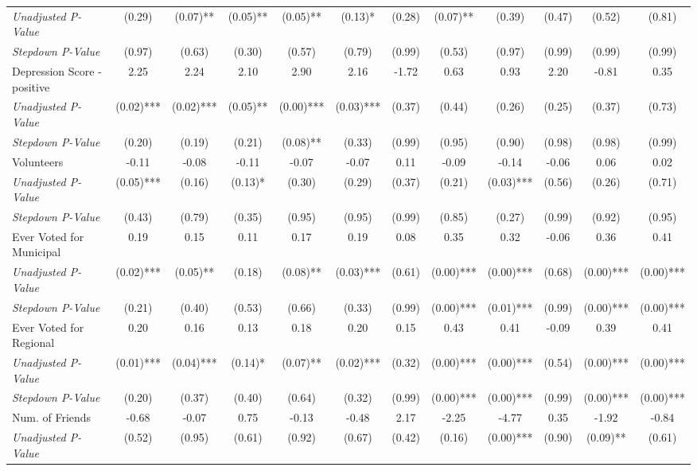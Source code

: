 \begin{tabular}{l c c c c c c c c c c c}
\quad \textit{Unadjusted P-Value} & (0.29) & (0.07)** & (0.05)** & (0.05)** & (0.13)* & (0.28) & (0.07)** & (0.39) & (0.47) & (0.52) & (0.81) \\
\quad \textit{Stepdown P-Value} & (0.97) & (0.63) & (0.30) & (0.57) & (0.79) & (0.99) & (0.53) & (0.97) & (0.99) & (0.99) & (0.99) \\
Depression Score - positive & 2.25 & 2.24 & 2.10 & 2.90 & 2.16 & -1.72 & 0.63 & 0.93 & 2.20 & -0.81 & 0.35 \\
\quad \textit{Unadjusted P-Value} & (0.02)*** & (0.02)*** & (0.05)** & (0.00)*** & (0.03)*** & (0.37) & (0.44) & (0.26) & (0.25) & (0.37) & (0.73) \\
\quad \textit{Stepdown P-Value} & (0.20) & (0.19) & (0.21) & (0.08)** & (0.33) & (0.99) & (0.95) & (0.90) & (0.98) & (0.98) & (0.99) \\
Volunteers & -0.11 & -0.08 & -0.11 & -0.07 & -0.07 & 0.11 & -0.09 & -0.14 & -0.06 & 0.06 & 0.02 \\
\quad \textit{Unadjusted P-Value} & (0.05)*** & (0.16) & (0.13)* & (0.30) & (0.29) & (0.37) & (0.21) & (0.03)*** & (0.56) & (0.26) & (0.71) \\
\quad \textit{Stepdown P-Value} & (0.43) & (0.79) & (0.35) & (0.95) & (0.95) & (0.99) & (0.85) & (0.27) & (0.99) & (0.92) & (0.95) \\
Ever Voted for Municipal & 0.19 & 0.15 & 0.11 & 0.17 & 0.19 & 0.08 & 0.35 & 0.32 & -0.06 & 0.36 & 0.41 \\
\quad \textit{Unadjusted P-Value} & (0.02)*** & (0.05)** & (0.18) & (0.08)** & (0.03)*** & (0.61) & (0.00)*** & (0.00)*** & (0.68) & (0.00)*** & (0.00)*** \\
\quad \textit{Stepdown P-Value} & (0.21) & (0.40) & (0.53) & (0.66) & (0.33) & (0.99) & (0.00)*** & (0.01)*** & (0.99) & (0.00)*** & (0.00)*** \\
Ever Voted for Regional & 0.20 & 0.16 & 0.13 & 0.18 & 0.20 & 0.15 & 0.43 & 0.41 & -0.09 & 0.39 & 0.41 \\
\quad \textit{Unadjusted P-Value} & (0.01)*** & (0.04)*** & (0.14)* & (0.07)** & (0.02)*** & (0.32) & (0.00)*** & (0.00)*** & (0.54) & (0.00)*** & (0.00)*** \\
\quad \textit{Stepdown P-Value} & (0.20) & (0.37) & (0.40) & (0.64) & (0.32) & (0.99) & (0.00)*** & (0.00)*** & (0.99) & (0.00)*** & (0.00)*** \\
Num. of Friends & -0.68 & -0.07 & 0.75 & -0.13 & -0.48 & 2.17 & -2.25 & -4.77 & 0.35 & -1.92 & -0.84 \\
\quad \textit{Unadjusted P-Value} & (0.52) & (0.95) & (0.61) & (0.92) & (0.67) & (0.42) & (0.16) & (0.00)*** & (0.90) & (0.09)** & (0.61) \\

\end{tabular}
